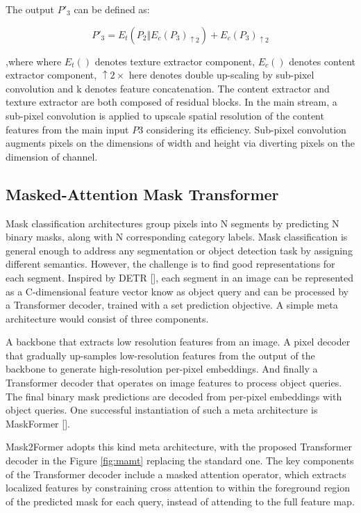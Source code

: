 \newpage
The output $P'_3$ can be defined as:

\begin{equation}
    P'_3 = E_t(P_2 \Vert E_c(P_3)_{\uparrow 2}) + E_c(P_3)_{\uparrow 2} \tag{5}
\end{equation}


,where where $E_t()$ denotes texture extractor component, $E_c()$ denotes content extractor component, $\uparrow 2\times$ here denotes double up-scaling by 
sub-pixel convolution and k denotes feature concatenation. The content extractor and texture extractor are both composed of residual blocks. In the main stream, 
a sub-pixel convolution is applied to upscale spatial resolution of the content features from the main input $P3$ considering its efficiency.
Sub-pixel convolution augments pixels on the dimensions of width and height via diverting pixels on the dimension of channel.


\subsection{Masked-Attention Mask Transformer} \label{mamt}

Mask classification architectures group pixels into N segments by predicting N binary masks, along with N corresponding category labels. 
Mask classification is general enough to address any segmentation or object detection task by assigning different semantics.
However, the  challenge is to find good representations for each segment. Inspired by DETR [], each segment in an image can be represented as a 
C-dimensional feature vector know as object query and can be processed by a Transformer decoder, trained with a set prediction objective. A simple meta 
architecture would consist of three components. 

A backbone that extracts low resolution features from an image. A pixel decoder that gradually up-samples low-resolution features from the output of the 
backbone to generate high-resolution per-pixel embeddings. And finally a Transformer decoder that operates on image features to process object queries. 
The final binary mask predictions are decoded from per-pixel embeddings with object queries. One successful instantiation of such a meta architecture is 
MaskFormer [].


Mask2Former adopts this kind meta architecture, with the proposed Transformer decoder in the Figure \ref{fig:mamt} replacing the standard one. The key 
components of the Transformer decoder include a masked attention operator, which extracts localized features by constraining cross attention to within the 
foreground region of the predicted mask for each query, instead of attending to the full feature map. 

